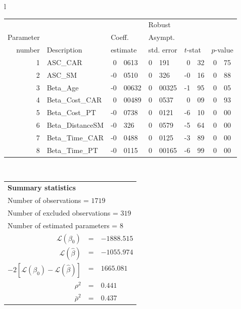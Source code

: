   \begin{tabular}{l}
\begin{tabular}{rlr@{.}lr@{.}lr@{.}lr@{.}l}
         &                       &   \multicolumn{2}{l}{}    & \multicolumn{2}{l}{Robust}  &     \multicolumn{4}{l}{}   \\
Parameter &                       &   \multicolumn{2}{l}{Coeff.}      & \multicolumn{2}{l}{Asympt.}  &     \multicolumn{4}{l}{}   \\
number &  Description                     &   \multicolumn{2}{l}{estimate}      & \multicolumn{2}{l}{std. error}  &   \multicolumn{2}{l}{$t$-stat}  &   \multicolumn{2}{l}{$p$-value}   \\

\hline

1 & ASC_CAR & 0&0613 & 0&191 & 0&32 & 0&75\\
2 & ASC_SM & -0&0510 & 0&326 & -0&16 & 0&88\\
3 & Beta_Age & -0&00632 & 0&00325 & -1&95 & 0&05\\
4 & Beta_Cost_CAR & 0&00489 & 0&0537 & 0&09 & 0&93\\
5 & Beta_Cost_PT & -0&0738 & 0&0121 & -6&10 & 0&00\\
6 & Beta_DistanceSM & -0&326 & 0&0579 & -5&64 & 0&00\\
7 & Beta_Time_CAR & -0&0488 & 0&0125 & -3&89 & 0&00\\
8 & Beta_Time_PT & -0&0115 & 0&00165 & -6&99 & 0&00\\
\hline
\end{tabular}
\\
\begin{tabular}{rcl}
\multicolumn{3}{l}{\bf Summary statistics}\\
\multicolumn{3}{l}{ Number of observations = $1719$} \\
\multicolumn{3}{l}{ Number of excluded observations = $319$} \\
\multicolumn{3}{l}{ Number of estimated  parameters = $8$} \\
 $\mathcal{L}(\beta_0)$ &=&  $-1888.515$ \\
 $\mathcal{L}(\hat{\beta})$ &=& $-1055.974 $  \\
 $-2[\mathcal{L}(\beta_0) -\mathcal{L}(\hat{\beta})]$ &=& $1665.081$ \\
    $\rho^2$ &=&   $0.441$ \\
    $\bar{\rho}^2$ &=&    $0.437$ \\
\end{tabular}
  \end{tabular}
